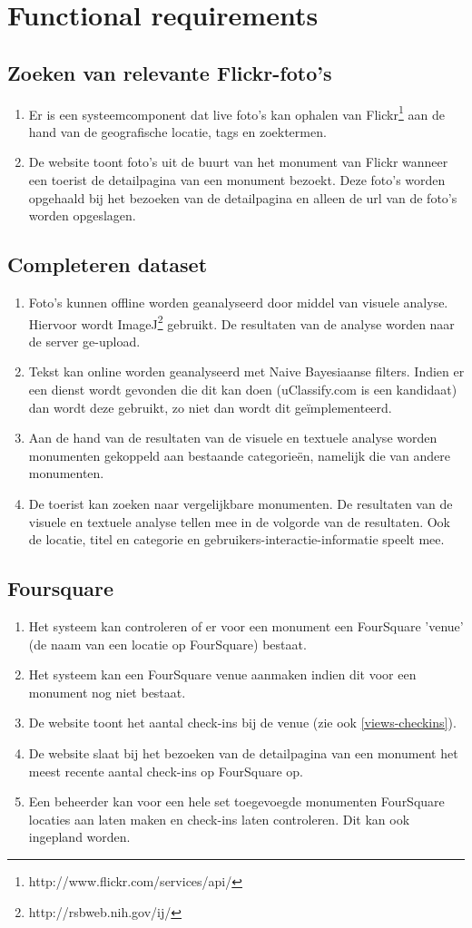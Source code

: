 \documentclass[a4paper,10pt]{article}
\newcommand{\rsection}[1]{
\section{#1}\label{sec:#1}
}
\newcommand{\rsubsection}[1]{
\subsection{#1}\label{sec:sub:#1}
}
\begin{document}
\clearpage
\rsection{Functional requirements}
\rsubsection{Zoeken van relevante Flickr-foto's}
\begin{enumerate}
\item Er is een systeemcomponent dat live foto's kan ophalen van Flickr\footnote{http://www.flickr.com/services/api/} aan de hand van de geografische locatie, tags en zoektermen.
\item De website toont foto's uit de buurt van het monument van Flickr wanneer een toerist de detailpagina van een monument bezoekt. Deze foto's worden opgehaald bij het bezoeken van de detailpagina en alleen de url van de foto's worden opgeslagen.
\end{enumerate}
            
\rsubsection{Completeren dataset}
\begin{enumerate}
\item Foto's kunnen offline worden geanalyseerd door middel van visuele analyse. Hiervoor wordt ImageJ\footnote{http://rsbweb.nih.gov/ij/} gebruikt. De resultaten van de analyse worden naar de server ge-upload.
 \item Tekst kan online worden geanalyseerd met Naive Bayesiaanse filters. Indien er een dienst wordt gevonden die dit kan doen (uClassify.com is een kandidaat) dan wordt deze gebruikt, zo niet dan wordt dit ge\"implementeerd.
\item Aan de hand van de resultaten van de visuele en textuele analyse worden monumenten gekoppeld aan bestaande categorie\"en, namelijk die van andere monumenten.
\item De toerist kan zoeken naar vergelijkbare monumenten. De resultaten van de visuele en textuele analyse tellen mee in de volgorde van de resultaten. Ook de locatie, titel en categorie en gebruikers-interactie-informatie speelt mee.
\end{enumerate}
    
\rsubsection{Foursquare}
\begin{enumerate}
\item Het systeem kan controleren of er voor een monument een FourSquare 'venue' (de naam van een locatie op FourSquare) bestaat.
\item Het systeem kan een FourSquare venue aanmaken indien dit voor een monument nog niet bestaat.
\item \label{4sq-checkins} De website toont het aantal check-ins bij de venue (zie ook \ref{views-checkins}).
\item De website slaat bij het bezoeken van de detailpagina van een monument het meest recente aantal check-ins op FourSquare op.
\item Een beheerder kan voor een hele set toegevoegde monumenten FourSquare locaties aan laten maken en check-ins laten controleren. Dit kan ook ingepland worden.
\end{enumerate}
                
\end{document}
